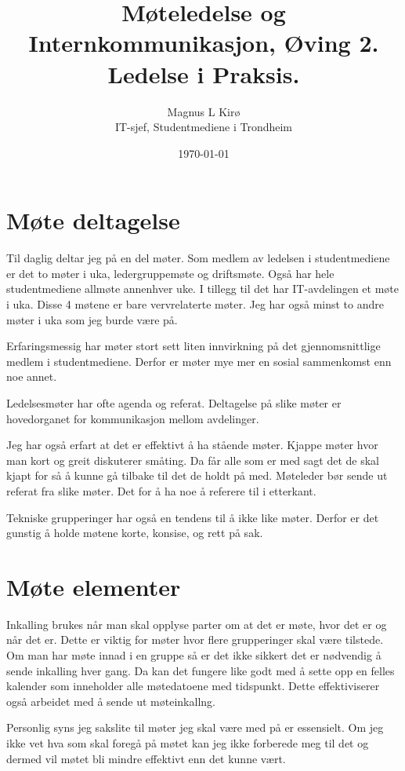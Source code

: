 \documentclass[12pt, a4paper]{article}
\title{
	Møteledelse og Internkommunikasjon, Øving 2. Ledelse i Praksis.
}
\author{
	Magnus L Kirø \\
	IT-sjef, Studentmediene i Trondheim %
}
\date{\today}
\begin{document}
\maketitle
{}

\section{Møte deltagelse}
Til daglig deltar jeg på en del møter. Som medlem av ledelsen i studentmediene
er det to møter i uka, ledergruppemøte og driftsmøte. Også har hele
studentmediene allmøte annenhver uke. I tillegg til det har IT-avdelingen et
møte i uka. Disse 4 møtene er bare vervrelaterte møter. Jeg har også minst to
andre møter i uka som jeg burde være på. 

Erfaringsmessig har møter stort sett liten innvirkning på det gjennomsnittlige
medlem i studentmediene. Derfor er møter mye mer en sosial sammenkomst enn noe
annet. 

Ledelsesmøter har ofte agenda og referat. Deltagelse på slike møter er
hovedorganet for kommunikasjon mellom avdelinger. 

Jeg har også erfart at det er effektivt å ha stående møter. Kjappe møter hvor
man kort og greit diskuterer småting. Da får alle som er med sagt det de skal
kjapt for så å kunne gå tilbake til det de holdt på med. Møteleder bør sende ut
referat fra slike møter. Det for å ha noe å referere til i etterkant. 

Tekniske grupperinger har også en tendens til å ikke like møter. Derfor er det
gunstig å holde møtene korte, konsise, og rett på sak. 

\section{Møte elementer}
Inkalling brukes når man skal opplyse parter om at det er møte, hvor det er og
når det er. Dette er viktig for møter hvor flere grupperinger skal være
tilstede. Om man har møte innad i en gruppe så er det ikke sikkert det er
nødvendig å sende inkalling hver gang. Da kan det fungere like godt med å sette
opp en felles kalender som inneholder alle møtedatoene med tidspunkt. Dette
effektiviserer også arbeidet med å sende ut møteinkallng.  

Personlig syns jeg sakslite til møter jeg skal være med på er essensielt. Om
jeg ikke vet hva som skal foregå på møtet kan jeg ikke forberede meg til det og
dermed vil møtet bli mindre effektivt enn det kunne vært. 
\end{document}
